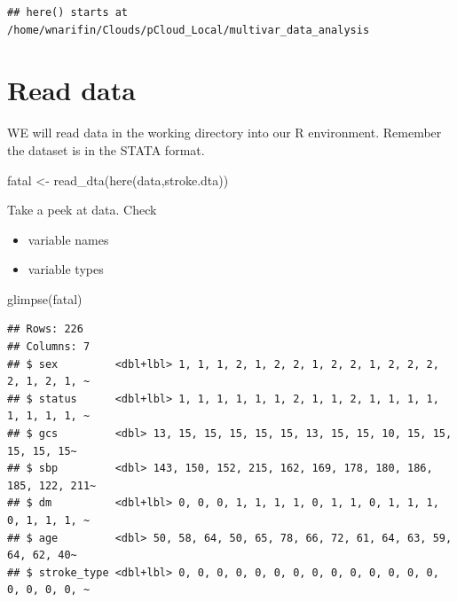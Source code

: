\documentclass[
  10pt,
]{krantz}
\newenvironment{Shaded}{\begin{snugshade}}{\end{snugshade}}
\newcommand{\FunctionTok}[1]{\textcolor[rgb]{0.00,0.00,0.00}{#1}}
\newcommand{\NormalTok}[1]{#1}
\newcommand{\OtherTok}[1]{\textcolor[rgb]{0.56,0.35,0.01}{#1}}
\newcommand{\StringTok}[1]{\textcolor[rgb]{0.31,0.60,0.02}{#1}}
\providecommand{\tightlist}{%
  \setlength{\itemsep}{0pt}\setlength{\parskip}{0pt}}
\begin{document}
\begin{verbatim}
## here() starts at /home/wnarifin/Clouds/pCloud_Local/multivar_data_analysis
\end{verbatim}

\hypertarget{read-data-1}{%
\section{Read data}\label{read-data-1}}

WE will read data in the working directory into our R environment. Remember the dataset is in the STATA format.

\begin{Shaded}
\begin{Highlighting}[]
\NormalTok{fatal }\OtherTok{\textless{}{-}} \FunctionTok{read\_dta}\NormalTok{(}\FunctionTok{here}\NormalTok{(}\StringTok{\textquotesingle{}data\textquotesingle{}}\NormalTok{,}\StringTok{\textquotesingle{}stroke.dta\textquotesingle{}}\NormalTok{))}
\end{Highlighting}
\end{Shaded}

Take a peek at data. Check

\begin{itemize}
\tightlist
\item
  variable names
\item
  variable types
\end{itemize}

\begin{Shaded}
\begin{Highlighting}[]
\FunctionTok{glimpse}\NormalTok{(fatal)}
\end{Highlighting}
\end{Shaded}

\begin{verbatim}
## Rows: 226
## Columns: 7
## $ sex         <dbl+lbl> 1, 1, 1, 2, 1, 2, 2, 1, 2, 2, 1, 2, 2, 2, 2, 1, 2, 1, ~
## $ status      <dbl+lbl> 1, 1, 1, 1, 1, 1, 2, 1, 1, 2, 1, 1, 1, 1, 1, 1, 1, 1, ~
## $ gcs         <dbl> 13, 15, 15, 15, 15, 15, 13, 15, 15, 10, 15, 15, 15, 15, 15~
## $ sbp         <dbl> 143, 150, 152, 215, 162, 169, 178, 180, 186, 185, 122, 211~
## $ dm          <dbl+lbl> 0, 0, 0, 1, 1, 1, 1, 0, 1, 1, 0, 1, 1, 1, 0, 1, 1, 1, ~
## $ age         <dbl> 50, 58, 64, 50, 65, 78, 66, 72, 61, 64, 63, 59, 64, 62, 40~
## $ stroke_type <dbl+lbl> 0, 0, 0, 0, 0, 0, 0, 0, 0, 0, 0, 0, 0, 0, 0, 0, 0, 0, ~
\end{verbatim}
\end{document}
